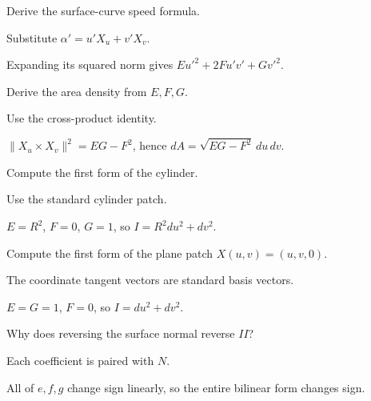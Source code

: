 \begin{exercise}\label{exr:vii15-04}
Derive the surface-curve speed formula.
\end{exercise}
\begin{hint}
Substitute \(\alpha'=u'X_u+v'X_v\).
\end{hint}
\begin{solution}
Expanding its squared norm gives \(Eu'^2+2Fu'v'+Gv'^2\).
\end{solution}

\begin{exercise}\label{exr:vii15-05}
Derive the area density from \(E,F,G\).
\end{exercise}
\begin{hint}
Use the cross-product identity.
\end{hint}
\begin{solution}
\(\|X_u\times X_v\|^2=EG-F^2\), hence \(dA=\sqrt{EG-F^2}\,du\,dv\).
\end{solution}

\begin{exercise}\label{exr:vii15-06}
Compute the first form of the cylinder.
\end{exercise}
\begin{hint}
Use the standard cylinder patch.
\end{hint}
\begin{solution}
\(E=R^2\), \(F=0\), \(G=1\), so \(I=R^2du^2+dv^2\).
\end{solution}

\begin{exercise}\label{exr:vii15-07}
Compute the first form of the plane patch \(X(u,v)=(u,v,0)\).
\end{exercise}
\begin{hint}
The coordinate tangent vectors are standard basis vectors.
\end{hint}
\begin{solution}
\(E=G=1\), \(F=0\), so \(I=du^2+dv^2\).
\end{solution}

\begin{exercise}\label{exr:vii15-08}
Why does reversing the surface normal reverse \(II\)?
\end{exercise}
\begin{hint}
Each coefficient is paired with \(N\).
\end{hint}
\begin{solution}
All of \(e,f,g\) change sign linearly, so the entire bilinear form changes sign.
\end{solution}

